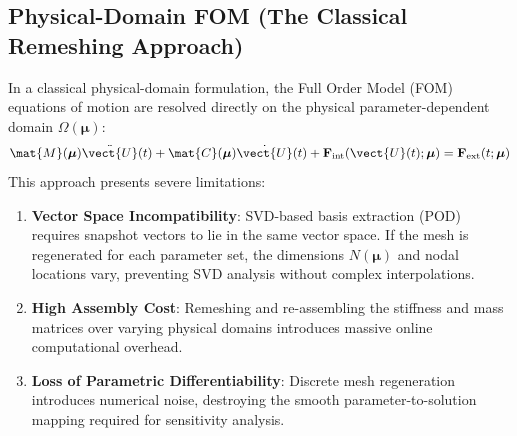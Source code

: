 \subsection{Physical-Domain FOM (The Classical Remeshing Approach)}
In a classical physical-domain formulation, the Full Order Model (FOM) equations of motion are resolved directly on the physical parameter-dependent domain $\Omega(\boldsymbol{\mu})$:
\begin{equation}
\mat{M}(\boldsymbol{\mu})\ddot{\vect{U}}(t) + \mat{C}(\boldsymbol{\mu})\dot{\vect{U}}(t) + \mathbf{F}_{\text{int}}(\vect{U}(t); \boldsymbol{\mu}) = \mathbf{F}_{\text{ext}}(t; \boldsymbol{\mu})
\end{equation}
This approach presents severe limitations:
\begin{enumerate}
    \item \textbf{Vector Space Incompatibility}: SVD-based basis extraction (POD) requires snapshot vectors to lie in the same vector space. If the mesh is regenerated for each parameter set, the dimensions $N(\boldsymbol{\mu})$ and nodal locations vary, preventing SVD analysis without complex interpolations.
    \item \textbf{High Assembly Cost}: Remeshing and re-assembling the stiffness and mass matrices over varying physical domains introduces massive online computational overhead.
    \item \textbf{Loss of Parametric Differentiability}: Discrete mesh regeneration introduces numerical noise, destroying the smooth parameter-to-solution mapping required for sensitivity analysis.
\end{enumerate}

